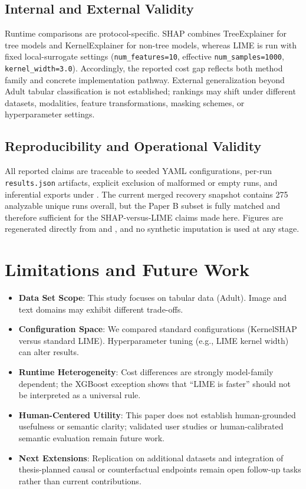 \documentclass[twoside,11pt]{article}
\begin{document}
\subsection{Internal and External Validity}
Runtime comparisons are protocol-specific. SHAP combines TreeExplainer
for tree models and KernelExplainer for non-tree models, whereas LIME is
run with fixed local-surrogate settings
(\texttt{num\_features=10}, effective \texttt{num\_samples=1000},
\texttt{kernel\_width=3.0}). Accordingly, the reported cost gap reflects
both method family and concrete implementation pathway. External
generalization beyond Adult tabular classification is not established;
rankings may shift under different datasets, modalities, feature
transformations, masking schemes, or hyperparameter settings.

\subsection{Reproducibility and Operational Validity}
All reported claims are traceable to seeded YAML configurations, per-run
\texttt{results.json} artifacts, explicit exclusion of malformed or
empty runs, and inferential exports under
. The current merged
recovery snapshot contains 275 analyzable unique runs overall, but the
Paper B subset is fully matched and therefore sufficient for the
SHAP-versus-LIME claims made here. Figures are regenerated directly from
 and
, and no synthetic
imputation is used at any stage.

\section{Limitations and Future Work}

\begin{itemize}
\item \textbf{Data Set Scope}: This study focuses on tabular data (Adult).
Image and text domains may exhibit different trade-offs.
\item \textbf{Configuration Space}: We compared standard configurations
(KernelSHAP versus standard LIME). Hyperparameter tuning (e.g., LIME
kernel width) can alter results.
\item \textbf{Runtime Heterogeneity}: Cost differences are strongly
model-family dependent; the XGBoost exception shows that ``LIME is
faster'' should not be interpreted as a universal rule.
\item \textbf{Human-Centered Utility}: This paper does not establish
human-grounded usefulness or semantic clarity; validated user studies or
human-calibrated semantic evaluation remain future work.
\item \textbf{Next Extensions}: Replication on additional datasets and
integration of thesis-planned causal or counterfactual endpoints remain
open follow-up tasks rather than current contributions.
\end{itemize}
\end{document}
